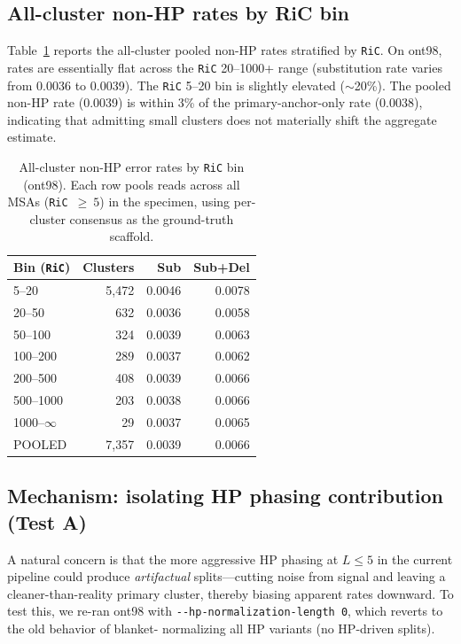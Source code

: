\documentclass[11pt]{article}
\begin{document}
\subsection{All-cluster non-HP rates by RiC bin}

Table~\ref{tab:approach2} reports the all-cluster pooled non-HP rates
stratified by \texttt{RiC}. On ont98, rates are essentially flat across the
\texttt{RiC} 20--1000+ range (substitution rate varies from 0.0036 to 0.0039).
The \texttt{RiC} 5--20 bin is slightly elevated ($\sim$20\%). The pooled
non-HP rate (0.0039) is within 3\% of the primary-anchor-only rate (0.0038),
indicating that admitting small clusters does not materially shift the
aggregate estimate.

\begin{table}[h]
\centering
\caption{All-cluster non-HP error rates by \texttt{RiC} bin (ont98). Each row
pools reads across all MSAs (\texttt{RiC}~$\geq~5$) in the specimen, using
per-cluster consensus as the ground-truth scaffold.}
\label{tab:approach2}
\small
\begin{tabular}{lrrr}
\toprule
Bin (\texttt{RiC}) & Clusters & Sub & Sub+Del \\
\midrule
5--20             & 5,472 & 0.0046 & 0.0078 \\
20--50              & 632 & 0.0036 & 0.0058 \\
50--100             & 324 & 0.0039 & 0.0063 \\
100--200            & 289 & 0.0037 & 0.0062 \\
200--500            & 408 & 0.0039 & 0.0066 \\
500--1000           & 203 & 0.0038 & 0.0066 \\
1000--$\infty$        & 29 & 0.0037 & 0.0065 \\
\midrule
POOLED           & 7,357 & 0.0039 & 0.0066 \\
\bottomrule
\end{tabular}
\end{table}

\subsection{Mechanism: isolating HP phasing contribution (Test A)}
\label{sec:test_a}

A natural concern is that the more aggressive HP phasing at $L \leq 5$ in
the current pipeline could produce \emph{artifactual} splits---cutting noise
from signal and leaving a cleaner-than-reality primary cluster, thereby
biasing apparent rates downward. To test this, we re-ran ont98 with
\texttt{-{}-hp-normalization-length~0}, which reverts to the old behavior of blanket-
normalizing all HP variants (no HP-driven splits).
\end{document}
